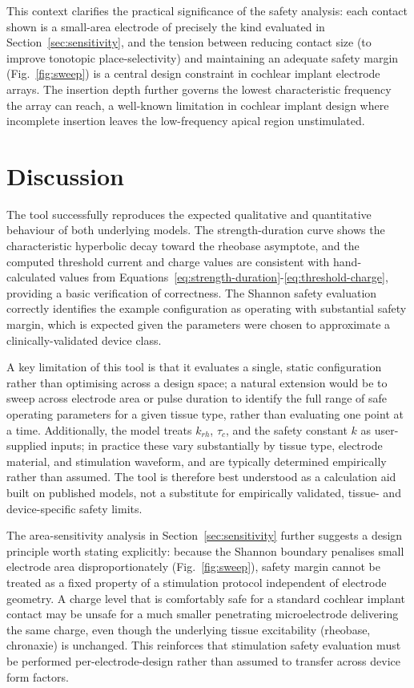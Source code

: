 \documentclass[conference]{IEEEtran}
\begin{document}
This context clarifies the practical significance of the safety analysis: each contact shown is a small-area electrode of precisely the kind evaluated in Section~\ref{sec:sensitivity}, and the tension between reducing contact size (to improve tonotopic place-selectivity) and maintaining an adequate safety margin (Fig.~\ref{fig:sweep}) is a central design constraint in cochlear implant electrode arrays. The insertion depth further governs the lowest characteristic frequency the array can reach, a well-known limitation in cochlear implant design where incomplete insertion leaves the low-frequency apical region unstimulated.

\section{Discussion}

The tool successfully reproduces the expected qualitative and quantitative behaviour of both underlying models. The strength-duration curve shows the characteristic hyperbolic decay toward the rheobase asymptote, and the computed threshold current and charge values are consistent with hand-calculated values from Equations~\ref{eq:strength-duration}-\ref{eq:threshold-charge}, providing a basic verification of correctness. The Shannon safety evaluation correctly identifies the example configuration as operating with substantial safety margin, which is expected given the parameters were chosen to approximate a clinically-validated device class.

A key limitation of this tool is that it evaluates a single, static configuration rather than optimising across a design space; a natural extension would be to sweep across electrode area or pulse duration to identify the full range of safe operating parameters for a given tissue type, rather than evaluating one point at a time. Additionally, the model treats $k_{rh}$, $\tau_c$, and the safety constant $k$ as user-supplied inputs; in practice these vary substantially by tissue type, electrode material, and stimulation waveform, and are typically determined empirically rather than assumed. The tool is therefore best understood as a calculation aid built on published models, not a substitute for empirically validated, tissue- and device-specific safety limits.

The area-sensitivity analysis in Section~\ref{sec:sensitivity} further suggests a design principle worth stating explicitly: because the Shannon boundary penalises small electrode area disproportionately (Fig.~\ref{fig:sweep}), safety margin cannot be treated as a fixed property of a stimulation protocol independent of electrode geometry. A charge level that is comfortably safe for a standard cochlear implant contact may be unsafe for a much smaller penetrating microelectrode delivering the same charge, even though the underlying tissue excitability (rheobase, chronaxie) is unchanged. This reinforces that stimulation safety evaluation must be performed per-electrode-design rather than assumed to transfer across device form factors.
\end{document}
